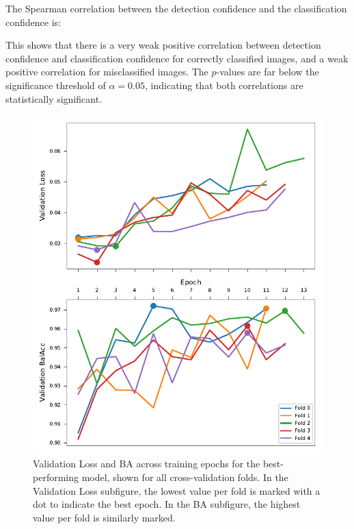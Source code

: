 The Spearman correlation between the detection confidence and the classification confidence is:



This shows that there is a very weak positive correlation between detection confidence and classification confidence for correctly classified images, and a weak positive correlation for misclassified images.
The $p$-values are far below the significance threshold of \( \alpha = 0.05 \), indicating that both correlations are statistically significant.

\begin{figure}[ht]
\centering
\includegraphics{figures/training_metrics_best_model.pdf}
\caption{Validation Loss and \acs{BA} across training epochs for the best-performing model, shown for all cross-validation folds. In the Validation Loss subfigure, the lowest value per fold is marked with a dot to indicate the best epoch. In the \acs{BA} subfigure, the highest value per fold is similarly marked.}
\label{fig:training_metrics_best_model}
\end{figure}    

